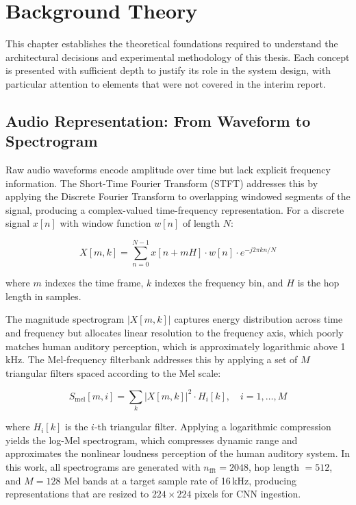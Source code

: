 \documentclass[oneside,openany]{final_report}
\begin{document}
\chapter{Background Theory}

This chapter establishes the theoretical foundations required to understand the architectural decisions and experimental methodology of this thesis. Each concept is presented with sufficient depth to justify its role in the system design, with particular attention to elements that were not covered in the interim report.

\section{Audio Representation: From Waveform to Spectrogram}

Raw audio waveforms encode amplitude over time but lack explicit frequency information. The Short-Time Fourier Transform (STFT) addresses this by applying the Discrete Fourier Transform to overlapping windowed segments of the signal, producing a complex-valued time-frequency representation. For a discrete signal $x[n]$ with window function $w[n]$ of length $N$:

\begin{equation}
    X[m, k] = \sum_{n=0}^{N-1} x[n + mH] \cdot w[n] \cdot e^{-j2\pi kn / N}
    \label{eq:stft}
\end{equation}

\noindent where $m$ indexes the time frame, $k$ indexes the frequency bin, and $H$ is the hop length in samples.

The magnitude spectrogram $|X[m,k]|$ captures energy distribution across time and frequency but allocates linear resolution to the frequency axis, which poorly matches human auditory perception, which is approximately logarithmic above 1\,kHz. The Mel-frequency filterbank addresses this by applying a set of $M$ triangular filters spaced according to the Mel scale:

\begin{equation}
    S_{\text{mel}}[m, i] = \sum_{k} |X[m,k]|^2 \cdot H_i[k], \quad i = 1, \ldots, M
    \label{eq:mel}
\end{equation}

\noindent where $H_i[k]$ is the $i$-th triangular filter. Applying a logarithmic compression yields the log-Mel spectrogram, which compresses dynamic range and approximates the nonlinear loudness perception of the human auditory system. In this work, all spectrograms are generated with $n_{\text{fft}} = 2048$, hop length $= 512$, and $M = 128$ Mel bands at a target sample rate of 16\,kHz, producing representations that are resized to $224 \times 224$ pixels for CNN ingestion.
\end{document}
